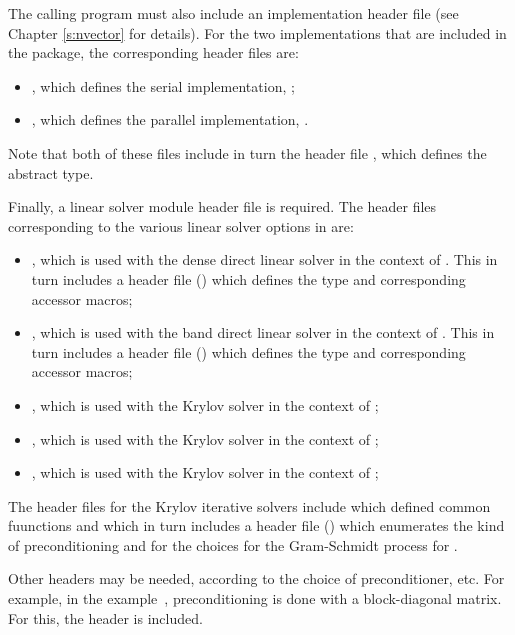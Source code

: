 The calling program must also include an {\nvector} implementation header file
(see Chapter \ref{s:nvector} for details).
For the two {\nvector} implementations that are included in the {\kinsol} package,
the corresponding header files are:
%
\begin{itemize}
\item {}, 
  which defines the serial implementation, {\nvecs};
\item {}, 
  which defines the parallel {\mpi} implementation, {\nvecp}.
\end{itemize}
%
Note that both of these files include in turn the header file , which 
defines the abstract  type. 

Finally, a linear solver module header file is required. 
The header files corresponding to the various linear solver options in
{\kinsol} are:
\begin{itemize}
\item {},
  which is used with the dense direct linear solver in 
  the context of {\kinsol}. This in turn includes a header file ()
  which defines the  type and corresponding accessor macros; 
\item {}, 
  which is used with the band direct linear solver in the
  context of {\kinsol}. This in turn includes a header file ()
  which defines the  type and corresponding accessor macros;
\item {}, 
  which is used with the Krylov solver {\spgmr} in the
  context of {\kinsol};
\item {}, 
  which is used with the Krylov solver {\spbcg} in the
  context of {\kinsol};
\item {}, 
  which is used with the Krylov solver {\sptfqmr} in the
  context of {\kinsol};
\end{itemize}

The header files for the Krylov iterative solvers include 
which defined common fuunctions and which in turn includes a header file ()
which enumerates the kind of preconditioning and for the choices for the Gram-Schmidt process for {\spgmr}.

Other headers may be needed, according to the choice of
preconditioner, etc. For example, in the  example~\cite{kinsol2.4.0_ex}, 
preconditioning is done with a block-diagonal matrix. For this, the header
 is included.

